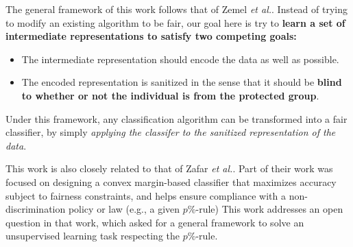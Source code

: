 The general framework of this work follows that of Zemel {\it et al.}\cite{Zemel2013}. Instead of trying to modify an existing algorithm to be fair, our goal here is try to {\bf learn a set of intermediate representations to satisfy two competing goals:}
\begin{itemize}
	\item The intermediate representation should encode the data as well as possible.
	\item The encoded representation is sanitized in the sense that it should be {\bf blind to whether or not the individual is from the protected group}.
\end{itemize}
    
Under this framework, any classification algorithm can be transformed into a fair classifier, by simply {\it applying the classifer to the sanitized representation of the data}.


This work is also closely related to that of Zafar {\it et al.}\cite{Zafar2017}.  Part of their work was focused on designing a convex margin-based classifier that maximizes accuracy subject to fairness constraints, and helps ensure compliance with a non-discrimination policy or law (e.g., a given $p\%$-rule)
This work addresses an open question in that work, which asked for a general framework to solve an unsupervised learning task respecting the $p\%$-rule.